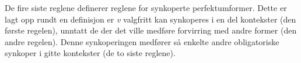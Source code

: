 \documentclass{article}
\let\w\emph
\begin{document}
De fire siste reglene definerer reglene for synkoperte perfektumformer. Dette
er lagt opp rundt en definisjon er \w{v} valgfritt kan synkoperes i en del
kontekster (den f\o{}rste regelen), unntatt de der det ville medf\o{}re
forvirring med andre former (den andre regelen). Denne synkoperingen
medf\o{}rer s\aa{} enkelte andre obligatoriske synkoper i gitte kontekster (de
to siste reglene).

\clearpage

{}

\tableofcontents
\listoftables
\end{document}
